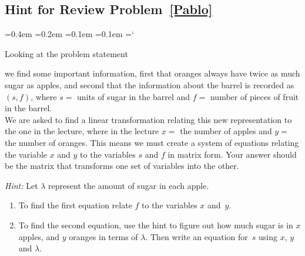 \subsection*{Hint for Review Problem~\ref{Pablo}}

{\ttfamily
{}\font=0.4em
\font=0.2em
\font=0.1em
\font=0.1em
\hyphenchar\font=`\-


\hypertarget{script_what_is_linear_algebra_hint}{Looking at the problem statement} 
we find some important information, first that oranges always have twice as much sugar as apples, and second that the information about the barrel is recorded as $(s,f)$, where  $s =$ units of sugar in the barrel and $f = $ number of pieces of fruit in the barrel.
\\
We are asked to find a linear transformation relating this new representation to the one in the lecture, where in the lecture $x=$ the number of apples and $y=$ the number of oranges. This means we must create a system of equations relating the variable $x$ and $y$ to the variables $s$ and $f$ in matrix form. Your answer should be the matrix that transforms one set of variables into the other.

\emph{Hint:} Let $\lambda$ represent the amount of sugar in each apple.
\begin{enumerate}
\item To find the first equation  relate $f$ to the variables $x$ and~$y$.
\item To find the second equation, use the hint to figure out how much sugar is in $x$ apples, and $y$ oranges in terms of 
$\lambda$. Then write an equation for~$s$ using $x$, $y$ and $\lambda$.
\end{enumerate}

}


